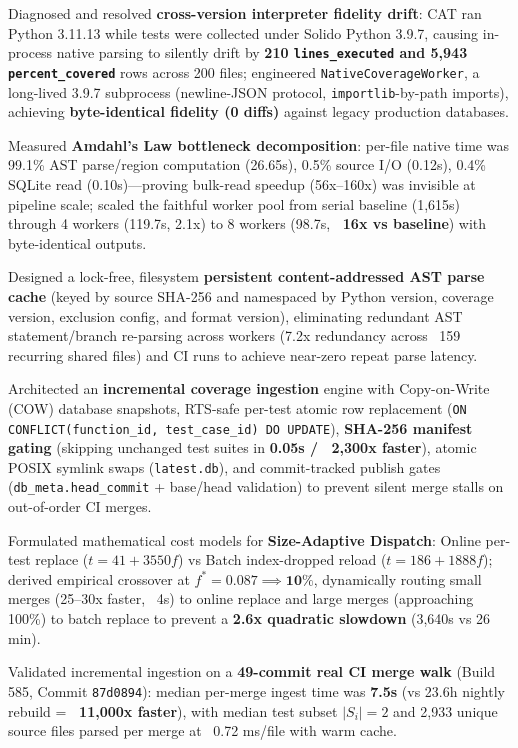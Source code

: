 {{        \item Diagnosed and resolved \textbf{cross-version interpreter fidelity drift}: CAT ran Python 3.11.13 while tests were collected under Solido Python 3.9.7, causing in-process native parsing to silently drift by \textbf{210 \texttt{lines\_executed} and 5,943 \texttt{percent\_covered}} rows across 200 files; engineered \texttt{NativeCoverageWorker}, a long-lived 3.9.7 subprocess (newline-JSON protocol, \texttt{importlib}-by-path imports), achieving \textbf{byte-identical fidelity (0 diffs)} against legacy production databases.
        \item Measured \textbf{Amdahl's Law bottleneck decomposition}: per-file native time was 99.1\% AST parse/region computation (26.65s), 0.5\% source I/O (0.12s), 0.4\% SQLite read (0.10s)---proving bulk-read speedup (56x--160x) was invisible at pipeline scale; scaled the faithful worker pool from serial baseline (1,615s) through 4 workers (119.7s, 2.1x) to 8 workers (98.7s, \textbf{~16x vs baseline}) with byte-identical outputs.
        \item Designed a lock-free, filesystem \textbf{persistent content-addressed AST parse cache} (keyed by source SHA-256 and namespaced by Python version, coverage version, exclusion config, and format version), eliminating redundant AST statement/branch re-parsing across workers (7.2x redundancy across ~159 recurring shared files) and CI runs to achieve near-zero repeat parse latency.
        \item Architected an \textbf{incremental coverage ingestion} engine with Copy-on-Write (COW) database snapshots, RTS-safe per-test atomic row replacement (\texttt{ON CONFLICT(function\_id, test\_case\_id) DO UPDATE}), \textbf{SHA-256 manifest gating} (skipping unchanged test suites in \textbf{0.05s / ~2,300x faster}), atomic POSIX symlink swaps (\texttt{latest.db}), and commit-tracked publish gates (\texttt{db\_meta.head\_commit} + base/head validation) to prevent silent merge stalls on out-of-order CI merges.
        \item Formulated mathematical cost models for \textbf{Size-Adaptive Dispatch}: Online per-test replace ($t = 41 + 3550f$) vs Batch index-dropped reload ($t = 186 + 1888f$); derived empirical crossover at $f^* = 0.087 \implies \mathbf{10\%}$, dynamically routing small merges (25--30x faster, ~4s) to online replace and large merges (approaching 100\%) to batch replace to prevent a \textbf{2.6x quadratic slowdown} (3,640s vs 26 min).
        \item Validated incremental ingestion on a \textbf{49-commit real CI merge walk} (Build 585, Commit \texttt{87d0894}): median per-merge ingest time was \textbf{7.5s} (vs 23.6h nightly rebuild = \textbf{~11,000x faster}), with median test subset $|S_i| = 2$ and 2,933 unique source files parsed per merge at ~0.72 ms/file with warm cache.
}}
